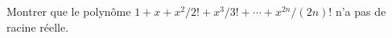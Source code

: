 Montrer que le polynôme $1 + x + x^2/2! + x^3/3! + \cdots + x^{2n}/(2n)!$ n'a pas de racine réelle.
